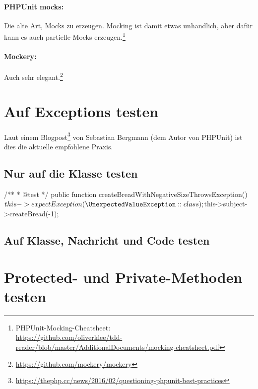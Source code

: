 \documentclass[a4paper,11pt,headsepline]{scrartcl}
\begin{document}
\paragraph{PHPUnit mocks:} Die alte Art, Mocks zu erzeugen. Mocking ist damit etwas unhandlich, aber dafür kann es auch partielle Mocks erzeugen.\footnote{PHPUnit-Mocking-Cheatsheet:\\ \url{https://github.com/oliverklee/tdd-reader/blob/master/AdditionalDocuments/mocking-cheatsheet.pdf}}
\paragraph{Mockery:} Auch sehr elegant.\footnote{\url{https://github.com/mockery/mockery}}



\pagebreak
\section{Auf Exceptions testen}

Laut einem Blogpost\footnote{\url{https://thephp.cc/news/2016/02/questioning-phpunit-best-practices}} von Sebastian Bergmann (dem Autor von PHPUnit) ist dies die aktuelle empfohlene Praxis.

\subsection{Nur auf die Klasse testen}
\begin{phpcode}
/**
 * @test
 */
public function createBreadWithNegativeSizeThrowsException()
{
    $this->expectException(\UnexpectedValueException::class);

    $this->subject->createBread(-1);
}
\end{phpcode}

\subsection{Auf Klasse, Nachricht und Code testen}


\section{Protected- und Private-Methoden testen}
\end{document}
